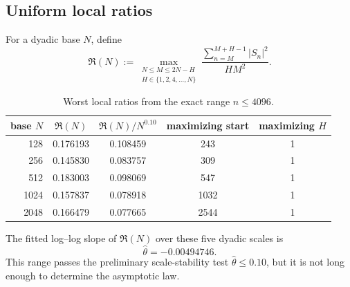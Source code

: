 \subsection{Uniform local ratios}

For a dyadic base $N$, define
\begin{equation}
 \mathfrak R(N)
 :=
 \max_{\substack{
 N\le M\le2N-H\\
 H\in\{1,2,4,\ldots,N\}
 }}
 \frac{\sum_{n=M}^{M+H-1}|S_n|^2}{HM^2}.
 \label{eq:worst-local-ratio}
\end{equation}

\begin{table}[htbp]
\centering
\caption{Worst local ratios from the exact range $n\le4096$.}
\label{tab:local-ratios}
\small
\begin{tabular}{rcccc}
\toprule
base $N$ &
$\mathfrak R(N)$ &
$\mathfrak R(N)/N^{0.10}$ &
maximizing start &
maximizing $H$\\
\midrule
128  & 0.176193 & 0.108459 & 243  & 1\\
256  & 0.145830 & 0.083757 & 309  & 1\\
512  & 0.183003 & 0.098069 & 547  & 1\\
1024 & 0.157837 & 0.078918 & 1032 & 1\\
2048 & 0.166479 & 0.077665 & 2544 & 1\\
\bottomrule
\end{tabular}
\end{table}

The fitted log--log slope of $\mathfrak R(N)$ over these five dyadic scales is
\begin{equation}
 \widehat\theta=-0.00494746.
 \label{eq:local-slope}
\end{equation}
This range passes the preliminary scale-stability test $\widehat\theta\le0.10$, but it is not long enough to determine the asymptotic law.

